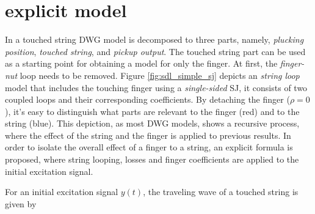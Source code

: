 \documentclass{sigchi}
\begin{document}
\section{explicit model}
In \cite{pakarinen_physical_2005} a touched string DWG model is decomposed to three parts, namely, \textit{plucking position}, \textit{touched string}, and \textit{pickup output}.
The touched string part can be used as a starting point for obtaining a model for only the finger.
At first, the \textit{finger-nut} loop needs to be removed. Figure \ref{fig:sdl_simple_sj} depicts an \textit{string loop} model that includes the touching finger using a \textit{single-sided} SJ, it consists of two coupled loops and their corresponding coefficients.
By detaching the finger ($\rho = 0$), it's easy to distinguish what parts are relevant to the finger (red) and to the string (blue).
This depiction, as most DWG models, shows a recursive process, where the effect of the string and the finger is applied to previous results.
In order to isolate the overall effect of a finger to a string, an explicit formula is proposed, where
string looping, losses and finger coefficients are applied to the initial excitation signal.

\begin{figure*}[h]
	\centering
	\scalebox{0.8}{}
	\caption{String loop with a scattering junction. $N$-roundtrip (blue), $F$-roundtrip (red)}
	\label{fig:sdl_simple_sj}
\end{figure*}


For an initial excitation signal $y(t)$, the traveling wave of a touched string is given by
\end{document}
